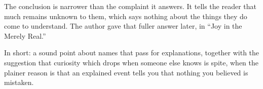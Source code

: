 \begin{afterword}
The conclusion is narrower than the complaint it answers. It tells the reader that much remains unknown to them, which says nothing about the things they do come to understand. The author gave that fuller answer later, in ``Joy in the Merely Real.''

In short: a sound point about names that pass for explanations, together with the suggestion that curiosity which drops when someone else knows is spite, when the plainer reason is that an explained event tells you that nothing you believed is mistaken.
\end{afterword}
